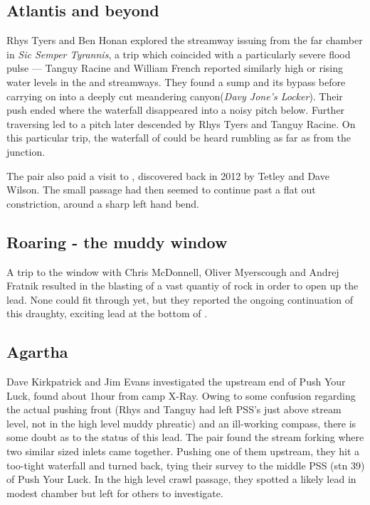 \subsection{Atlantis and beyond}
Rhys Tyers and Ben Honan explored the streamway issuing from the far chamber in \emph{Sic Semper Tyrannis}, a trip which coincided with a particularly severe flood pulse --- Tanguy Racine and William French reported similarly high or rising water levels in the  and  streamways. They found a sump and its bypass before carrying on into a deeply cut meandering canyon(\emph{Davy Jone's Locker}). Their push ended where the waterfall disappeared into a noisy pitch below. Further traversing led to a pitch later descended by Rhys Tyers and Tanguy Racine. On this particular trip, the waterfall of  could be heard rumbling as far as from the  junction. 

The pair also paid a visit to , discovered back in 2012 by Tetley and Dave Wilson. The small passage had then seemed to continue past a flat out constriction, around a sharp left hand bend. 

\subsection{Roaring - the muddy window}
A trip to the  window with Chris McDonnell, Oliver Myerscough and Andrej Fratnik resulted in the blasting of a vast quantiy of rock in order to open up the lead. None could fit through yet, but they reported the ongoing continuation of this draughty, exciting lead at the bottom of .


\subsection{Agartha}
Dave Kirkpatrick and Jim Evans investigated the upstream end of Push Your Luck, found about 1hour from camp X-Ray. Owing to some confusion regarding the actual pushing front (Rhys and Tanguy had left PSS's just above stream level, not in the high level muddy phreatic) and an ill-working compass, there is some doubt as to the status of this lead. The pair found the stream forking where two similar sized inlets came together. Pushing one of them upstream, they hit a too-tight waterfall and turned back, tying their survey to the middle PSS (stn 39) of Push Your Luck. In the high level crawl passage, they spotted a likely lead in modest chamber but left for others to investigate.



